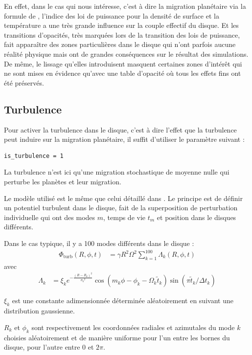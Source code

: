 En effet, dans le cas qui nous intéresse, c'est à dire la migration planétaire via la formule de \citep{paardekooper2011torque}, l'indice des loi de puissance pour la densité de surface et la température a une très grande influence sur la couple effectif du disque. Et les transitions d'opacités, très marquées lors de la transition des lois de puissance, fait apparaître des zones particulières dans le disque qui n'ont parfois aucune réalité physique mais ont de grandes conséquences sur le résultat des simulations. De même, le lissage qu'elles introduisent masquent certaines zones d'intérêt qui ne sont mises en évidence qu'avec une table d'opacité où tous les effets fins ont été préservés.

\subsection{Turbulence}
Pour activer la turbulence dans le disque, c'est à dire l'effet que la turbulence peut induire sur la migration planétaire, il suffit d'utiliser le paramètre suivant : 
\begin{verbatim}
is_turbulence = 1
\end{verbatim}

La turbulence n'est ici qu'une migration stochastique de moyenne nulle qui perturbe les planètes et leur migration. 

Le modèle utilisé est le même que celui détaillé dans \cite{ogihara2007accretion}. Le principe est de définir un potentiel turbulent dans le disque, fait de la superposition de perturbation individuelle qui ont des modes $m$, temps de vie $t_m$ et position dans le disques différents. 

Dans le cas typique, il y a 100 modes différents dans le disque : 
\begin{align}
\Phi_\text{turb}(R,\phi,t) &= \gamma R^2 \Omega^2 \sum_{k=1}^{100} \Lambda_k(R,\phi,t)
\end{align}
avec 
\begin{align}
\Lambda_k &= \xi_k e^{-\frac{(R-R_k)^2}{{\sigma_k}^2}} \cos\left(m_k \phi -\phi_k - \Omega_k\tilde{t}_k\right) \sin\left(\pi \tilde{t}_k/\Delta t_k\right)
\end{align}

$\xi_k$ est une constante adimensionnée déterminée aléatoirement en suivant une distribution gaussienne.

$R_k$ et $\phi_k$ sont respectivement les coordonnées radiales et azimutales du mode $k$ choisies aléatoirement et de manière uniforme pour l'un entre les bornes du disque, pour l'autre entre $0$ et $2\pi$. 

